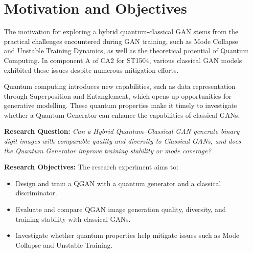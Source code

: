 \section{Motivation and Objectives}

The motivation for exploring a hybrid quantum-classical GAN stems from the practical challenges encountered during GAN training, such as Mode Collapse and Unstable Training Dynamics, as well as the theoretical potential of Quantum Computing. In component A of CA2 for ST1504, various classical GAN models exhibited these issues despite numerous mitigation efforts.

Quantum computing introduces new capabilities, such as data representation through Superposition and Entanglement, which opens up opportunities for generative modelling. These quantum properties make it timely to investigate whether a Quantum Generator can enhance the capabilities of classical GANs.

\textbf{Research Question:}  
\emph{Can a Hybrid Quantum–Classical GAN generate binary digit images with comparable quality and diversity to Classical GANs, and does the Quantum Generator improve training stability or mode coverage?}

\textbf{Research Objectives:}  
The research experiment aims to:
\begin{itemize}
    \item Design and train a QGAN with a quantum generator and a classical discriminator.
    \item Evaluate and compare QGAN image generation quality, diversity, and training stability with classical GANs.
    \item Investigate whether quantum properties help mitigate issues such as Mode Collapse and Unstable Training.
\end{itemize}

